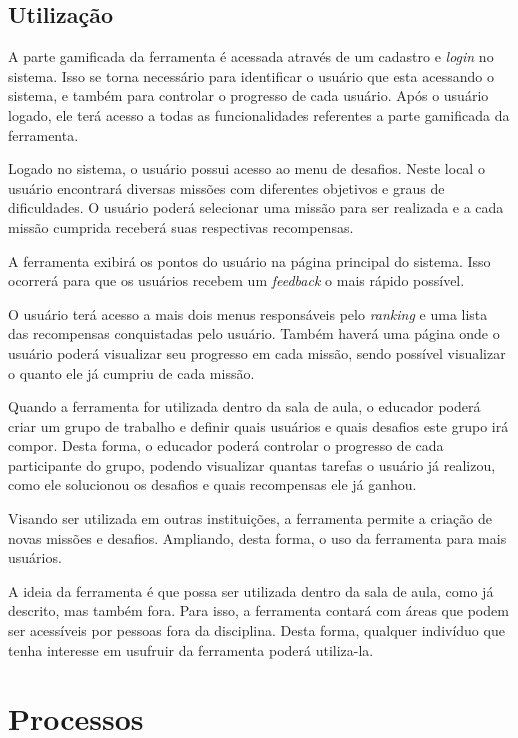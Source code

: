 \documentclass[
	12pt,				%
	oneside,			%
	a4paper,			%
	english,			%
	french,				%
	spanish,			%
	brazil,				%
	]{abntex2}
\begin{document}
\subsection{Utilização}

A parte gamificada da ferramenta é acessada através de um cadastro e \textit{login} no sistema. Isso se torna necessário para identificar o usuário que esta acessando o sistema, e também para controlar o progresso de cada usuário. Após o usuário logado, ele terá acesso a todas as funcionalidades referentes a parte gamificada da ferramenta.

Logado no sistema, o usuário possui acesso ao menu de desafios. Neste local o usuário encontrará diversas missões com diferentes objetivos e graus de dificuldades. O usuário poderá selecionar uma missão para ser realizada e a cada missão cumprida receberá suas respectivas recompensas.

A ferramenta exibirá os pontos do usuário na página principal do sistema. Isso ocorrerá para que os usuários recebem um \textit{feedback} o mais rápido possível.

O usuário terá acesso a mais dois menus responsáveis pelo \textit{ranking} e uma lista das recompensas conquistadas pelo usuário. Também haverá uma página onde o usuário poderá visualizar seu progresso em cada missão, sendo possível visualizar o quanto ele já cumpriu de cada missão.

Quando a ferramenta for utilizada dentro da sala de aula, o educador poderá criar um grupo de trabalho e definir quais usuários e quais desafios este grupo irá compor. Desta forma, o educador poderá controlar o progresso de cada participante do grupo, podendo visualizar quantas tarefas o usuário já realizou, como ele solucionou os desafios e quais recompensas ele já ganhou.

Visando ser utilizada em outras instituições, a ferramenta permite a criação de novas missões e desafios. Ampliando, desta forma, o uso da ferramenta para mais usuários.

A ideia da ferramenta é que possa ser utilizada dentro da sala de aula, como já descrito, mas também fora. Para isso, a ferramenta contará com áreas que podem ser acessíveis por pessoas fora da disciplina. Desta forma, qualquer indivíduo que tenha interesse em usufruir da ferramenta poderá utiliza-la.

\section{Processos}
\label{sec:processos}
\end{document}

